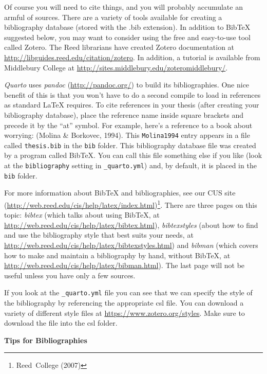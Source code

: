 \documentclass[
  letterpaper,
  12pt,
  twoside]{reedthesis}
\begin{document}
Of course you will need to cite things, and you will probably accumulate
an armful of sources. There are a variety of tools available for
creating a bibliography database (stored with the .bib extension). In
addition to BibTeX suggested below, you may want to consider using the
free and easy-to-use tool called Zotero. The Reed librarians have
created Zotero documentation at
\url{http://libguides.reed.edu/citation/zotero}. In addition, a tutorial
is available from Middlebury College at
\url{http://sites.middlebury.edu/zoteromiddlebury/}.

\emph{Quarto} uses \emph{pandoc} (\url{http://pandoc.org/}) to build its
bibliographies. One nice benefit of this is that you won't have to do a
second compile to load in references as standard LaTeX requires. To cite
references in your thesis (after creating your bibliography database),
place the reference name inside square brackets and precede it by the
``at'' symbol. For example, here's a reference to a book about worrying:
(Molina \& Borkovec, 1994). This \texttt{Molina1994} entry appears in a
file called \texttt{thesis.bib} in the \texttt{bib} folder. This
bibliography database file was created by a program called BibTeX. You
can call this file something else if you like (look at the
\texttt{bibliography} setting in \texttt{\_quarto.yml}) and, by default,
it is placed in the \texttt{bib} folder.

For more information about BibTeX and bibliographies, see our CUS site
(\url{http://web.reed.edu/cis/help/latex/index.html})\footnote{Reed~College
  (2007)}. There are three pages on this topic: \emph{bibtex} (which
talks about using BibTeX, at
\url{http://web.reed.edu/cis/help/latex/bibtex.html}),
\emph{bibtexstyles} (about how to find and use the bibliography style
that best suits your needs, at
\url{http://web.reed.edu/cis/help/latex/bibtexstyles.html}) and
\emph{bibman} (which covers how to make and maintain a bibliography by
hand, without BibTeX, at
\url{http://web.reed.edu/cis/help/latex/bibman.html}). The last page
will not be useful unless you have only a few sources.

If you look at the \texttt{\_quarto.yml} file you can see that we can
specify the style of the bibliography by referencing the appropriate csl
file. You can download a variety of different style files at
\url{https://www.zotero.org/styles}. Make sure to download the file into
the csl folder.

\textbf{Tips for Bibliographies}
\end{document}
